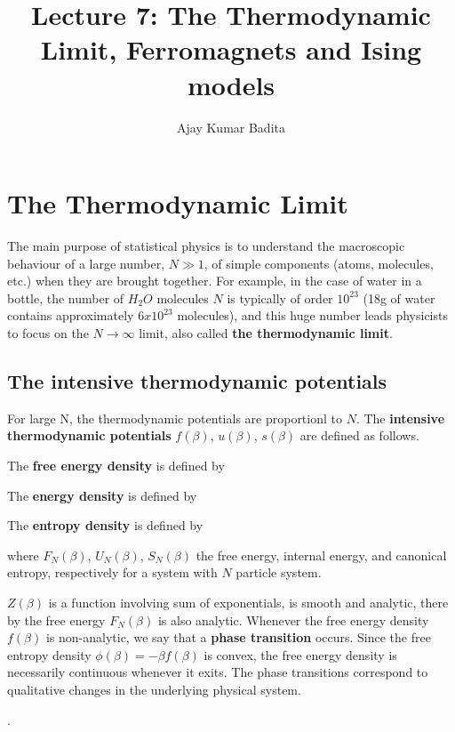 \documentclass[letterpaper,english,12pt]{article}
\title{Lecture 7: The Thermodynamic Limit, Ferromagnets and Ising models}
\author{Ajay Kumar Badita}
\begin{document}
\maketitle
\section{The Thermodynamic Limit}
The main purpose of statistical physics is to understand the macroscopic behaviour of a large number, $N\gg1$, of simple components (atoms, molecules, etc.) when they are brought together.
For example, in the case of water in a bottle, the number of $H_2 O$ molecules $N$ is typically of order $10^{23}$ (18g of water contains approximately $6x10^{23}$ molecules), and this huge number leads physicists to focus on the $N \rightarrow \infty$ limit, also called \textbf{the thermodynamic limit}.

\subsection{The intensive thermodynamic potentials}
For large N, the thermodynamic potentials are proportionl to $N$. The \textbf{intensive thermodynamic potentials} $f (\beta)$, $u (\beta)$, $s (\beta)$ are defined as follows.

\begin{defn}
The \textbf{free energy density} is defined by 
\end{defn}

\begin{defn}
The \textbf{energy density} is defined by 
\end{defn}

\begin{defn}
The \textbf{entropy density} is defined by 
\end{defn}

where $F_N (\beta)$, $U_N (\beta)$, $S_N (\beta)$ the free energy, internal energy, and canonical entropy, respectively for a system with $N$  particle system.

\begin{defn}
$Z (\beta)$ is a function involving sum of exponentials, is smooth and analytic, there by the free energy $F_N (\beta)$ is also analytic.
Whenever the free energy density $f (\beta)$ is non-analytic, we say that a \textbf{phase transition} occurs.
Since the free entropy density $\phi (\beta) = -\beta f(\beta)$ is convex, the free energy density is necessarily continuous whenever it exits.
The phase transitions correspond to qualitative changes in the underlying physical system.
\end{defn}.  
\end{document}
